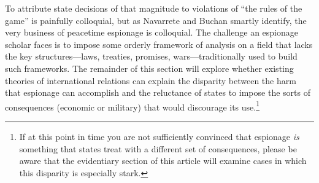 \documentclass[12pt]{extarticle}
\begin{document}
To attribute state decisions of that magnitude to violations of \enquote{the rules of the game} is painfully colloquial, but as Navarrete and Buchan smartly identify, the very business of peacetime espionage is colloquial. The challenge an espionage scholar faces is to impose some orderly framework of analysis on a field that lacks the key structures---laws, treaties, promises, wars---traditionally used to build such frameworks. The remainder of this section will explore whether existing theories of international relations can explain the disparity between the harm that espionage can accomplish and the reluctance of states to impose the sorts of consequences (economic or military) that would discourage its use.\footnote{If at this point in time you are not sufficiently convinced that espionage \emph{is} something that states treat with a different set of consequences, please be aware that the evidentiary section of this article will examine cases in which this disparity is especially stark.}


\end{document}
